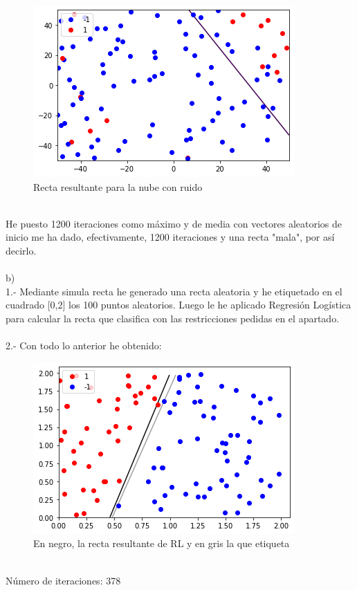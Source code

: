 \documentclass[12pt]{article}
\begin{document}
\begin{figure}[h]
\centering
\includegraphics[scale=0.75]{Images/Ej2a2.png} 
\caption{Recta resultante para la nube con ruido}
\label{etiqueta}
\end{figure}
\\
He puesto 1200 iteraciones como máximo y de media con vectores aleatorios de inicio me ha dado, efectivamente, 1200 iteraciones y una recta "mala", por así decirlo. \\\\
b)\\
1.- Mediante simula recta he generado una recta aleatoria y he etiquetado en el cuadrado [0,2] los 100 puntos aleatorios. Luego le he aplicado Regresión Logística para calcular la recta que clasifica con las restricciones pedidas en el apartado.\\\\
2.- Con todo lo anterior he obtenido: \\
\begin{figure}[h]
\centering
\includegraphics[scale=0.75]{Images/Ej2b1.png} 
\caption{En negro, la recta resultante de RL y en gris la que etiqueta}
\label{etiqueta}
\end{figure}
\\
Número de iteraciones: 378\\
\end{document}
